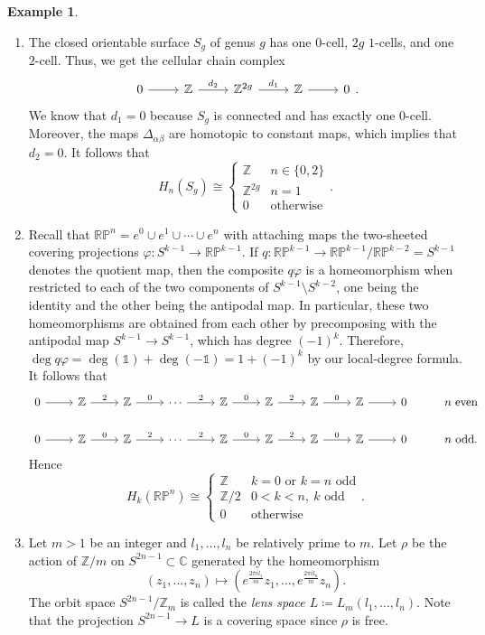 \documentclass[10pt,letterpaper,cm]{nupset}
\theoremstyle{definition}
\newtheorem{exmp}[definition]{Example}
\theoremstyle{theorem}
\theoremstyle{remark}
\newcommand{\C}{\mathbb C}
\newcommand{\RP}{\mathbb{RP}}
\newcommand{\Z}{\mathbb Z}
\newcommand{\1}{\mathbb{1}}
\newcommand{\0}{\vec 0}
\begin{document}
\begin{exmp} $ $
\begin{enumerate}
\item The closed orientable surface $S_g$ of genus $g$ has one $0$-cell, $2g$ $1$-cells, and one $2$-cell. Thus, we get the cellular chain complex 
\[
\begin{tikzcd}
0 \arrow[r] & \Z \arrow[r, "d_2"] & \Z^{2g} \arrow[r, "d_1"] & \Z \arrow[r] & 0
\end{tikzcd}
.\] We know that $d_1=0$ because $S_g$ is connected and has exactly one $0$-cell. Moreover, the maps $\Delta_{\alpha{\beta}}$ are homotopic to constant maps, which implies that $d_2 =0$. It follows that $$  H_n(S_g) \cong \begin{cases}  \Z & n\in \{0,2\} \\ \Z^{2g} & n =1 \\ 0 & \text{otherwise} \end{cases}  .$$
\item Recall that $\RP^n = e^0 \cup e^1 \cup \cdots \cup e^n$ with attaching maps the two-sheeted covering projections $\varphi : S^{k-1} \to \RP^{k-1}$. If $q : \RP^{k-1} \to \RP^{k-1}/\RP^{k-2} = S^{k-1}$ denotes the quotient map, then the composite $q{\varphi}$ is a homeomorphism when restricted to each of the two components of $S^{k-1} \setminus S^{k-2}$, one being the identity and the other being the antipodal map. In particular, these two homeomorphisms are obtained from each other by precomposing with the antipodal map $S^{k-1} \to S^{k-1}$, which has degree $\left({-1}\right)^k$. Therefore, $\deg{q\varphi} = \deg(\1)+\deg({-\1}) = 1+({-1})^k$ by our local-degree formula. It follows that
\[
\begin{tikzcd}
0 \arrow[r] & \Z \arrow[r, "2"] & \Z \arrow[r, "0"] & \cdots \arrow[r, "2"] & \Z \arrow[r, "0"] & \Z \arrow[r, "2"] & \Z \arrow[r, "0"] & \Z \arrow[r] & 0 & n \text{ even} \\
0 \arrow[r] & \Z \arrow[r, "0"] & \Z \arrow[r, "2"] & \cdots \arrow[r, "2"] & \Z \arrow[r, "0"] & \Z \arrow[r, "2"] & \Z \arrow[r, "0"] & \Z \arrow[r] & 0 & n \text{ odd}.
\end{tikzcd}
\] Hence $$ H_k(\RP^n) \cong \begin{cases}   \Z & k=0 \text{ or } k=n \text{ odd} \\ \Z/2 & 0< k<n, \ k \text{ odd}  \\ 0 & \text{otherwise} \end{cases}  .$$
\item Let $m>1$ be an integer and $l_1, \ldots, l_n$ be relatively prime to $m$. Let $\rho$ be the action of $\Z/m$ on $S^{2n-1} \subset \C$ generated by the homeomorphism $$\left(z_1, \ldots, z_n\right) \mapsto (e^{\frac{2\pi il_1}{m}}z_1, \ldots, e^{\frac{2\pi il_n}{m}}z_n).$$  The orbit space $S^{2n-1}/\Z_m$ is called the \textit{lens space $L\coloneqq  L_m(l_1, \ldots, l_n)$}. Note that the projection $S^{2n-1} \to L$ is a covering space since $\rho$ is free.
\end{enumerate}

\end{exmp}
\end{document}
